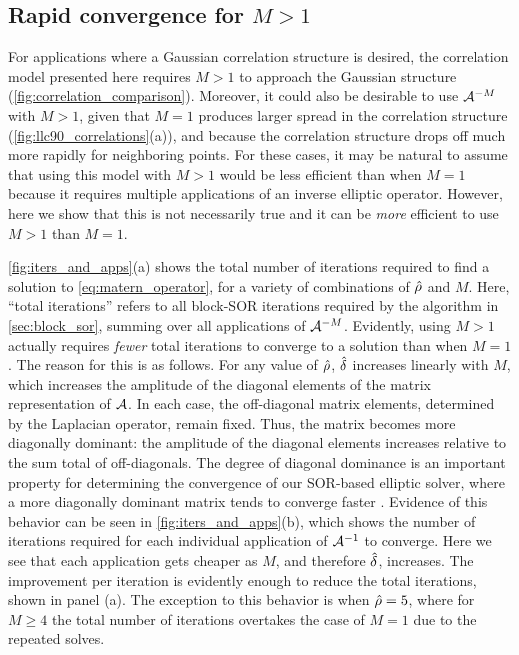 \subsection{Rapid convergence for $M>1$}
\label{ssec:iters_and_apps}

For applications where a Gaussian correlation structure is desired, the
correlation model presented here requires $M>1$ to approach the Gaussian
structure (\cref{fig:correlation_comparison}).
Moreover, it could also be desirable to use $\mathcal{A}^{-M}$ with $M>1$,
given that $M=1$ produces larger spread in the correlation structure
(\cref{fig:llc90_correlations}(a)), and because the correlation structure drops
off much more rapidly for neighboring points.
For these cases, it may be natural to assume that using this model with $M>1$
would be less efficient than when $M=1$ because it requires multiple
applications of an inverse elliptic operator.
However, here we show that this is not necessarily true and it can be
\textit{more} efficient to use $M>1$ than $M=1$.

\cref{fig:iters_and_apps}(a) shows the total number of iterations required to
find a solution to \cref{eq:matern_operator}, for a variety of combinations of
$\hat{\rho}$ and $M$.
Here, ``total iterations'' refers to all block-SOR iterations
required by the algorithm in \cref{sec:block_sor}, summing over all applications
of $\mathcal{A}^{-M}$.
Evidently, using $M>1$ actually requires \textit{fewer} total iterations to converge to a
solution than when $M=1$.
The reason for this is as follows.
For any value of $\hat{\rho}$, $\hat{\delta}$ increases linearly with $M$, which
increases the amplitude of the diagonal elements of the matrix representation of
$\mathcal{A}$.
In each case, the off-diagonal matrix elements, determined by the Laplacian
operator, remain fixed.
Thus, the matrix becomes more diagonally dominant:
the amplitude of the diagonal elements increases relative to the sum total of
off-diagonals.
The degree of diagonal dominance is an important property for
determining the convergence of our SOR-based elliptic solver, where a more
diagonally dominant matrix tends to converge faster \citep{golub_matrix_2013}.
Evidence of this behavior can be seen in \cref{fig:iters_and_apps}(b), which shows the
number of iterations required for each individual application of
$\mathcal{A}^{-1}$ to converge.
Here we see that each application gets cheaper as $M$, and therefore $\hat{\delta}$,
increases.
The improvement per iteration is evidently enough to reduce the total
iterations, shown in panel (a).
The exception to this behavior is when $\hat{\rho} = 5$, where for $M\ge 4$
the total number of iterations overtakes the case of $M=1$ due to the repeated
solves.

